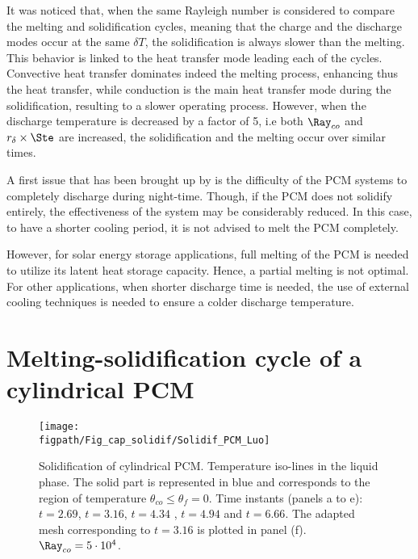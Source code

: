 It was noticed that, when the same Rayleigh number is considered to compare the melting and solidification cycles, meaning that the charge and the discharge modes occur at the same $\delta T$, the solidification is always slower than the melting. 
This behavior is linked to the heat transfer mode leading each of the cycles. 
Convective heat transfer dominates indeed the melting process, enhancing thus the heat transfer, while conduction is the main heat transfer mode during the solidification, resulting to a slower operating process.
However, when the discharge temperature is decreased by a factor of 5, i.e both $\Ray_{co}$ and $r_{\delta} \times \Ste$ are increased, the solidification and the melting occur over similar times.

A first issue that has been brought up by \cite{ascione2014energy} is the difficulty of the PCM systems to completely discharge during night-time.
Though, if the PCM does not solidify entirely, the effectiveness of the system may be considerably reduced.
In this case, to have a shorter cooling period, it is not advised to melt the PCM completely.

However, for solar energy storage applications, full melting of the PCM is needed to utilize its latent heat storage capacity.
Hence, a partial melting is not optimal.  For other applications, when shorter discharge time is needed, the use of external cooling techniques is needed to ensure a colder discharge temperature.

\newpage
\section{Melting-solidification cycle of a cylindrical PCM} \label{sec-cycle-cylindric}
\begin{figure}
\begin{center}
\begin{minipage}[t]{0.9\textwidth}
	\texttt{[image: \\figpath/Fig\_cap\_solidif/Solidif\_PCM\_Luo]}
\end{minipage}
\end{center}
\caption{Solidification of cylindrical PCM. Temperature iso-lines in the liquid phase. The solid part is represented in blue and corresponds to the region of temperature $\theta_{co} \leq \theta_f=0$. Time instants (panels  a to e): $t= 2.69$, $t = 3.16$, $t = 4.34$ , $t = 4.94$ and $t = 6.66$. The adapted mesh corresponding to $t = 3.16$ is plotted in panel (f).  $ \Ray_{co}=5 \cdot 10^4$.}\label{fig:cycle-cylindric-evol}
\end{figure}

